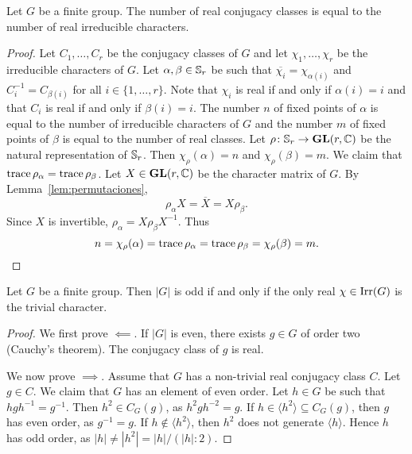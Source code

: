 \begin{theorem}[Burnside]
    Let $G$ be a finite group. The number of real conjugacy classes is equal 
    to the number of real irreducible characters. 
\end{theorem}

\begin{proof}
  Let $C_1,\dots,C_r$ be the conjugacy classes of $G$ and  
  let $\chi_1,\dots,\chi_r$ be the irreducible characters of $G$. 
  Let $\alpha,\beta\in\mathbb{S}_r$ be such that $\overline{\chi_i}=\chi_{\alpha(i)}$ and 
  $C_i^{-1}=C_{\beta(i)}$ for all $i\in\{1,\dots,r\}$. Note that $\chi_i$
  is real if and only if $\alpha(i)=i$ and that $C_i$ is real if and only if 
  $\beta(i)=i$. The number $n$ of fixed points of $\alpha$ is equal to the number
  of irreducible characters of $G$ and the number $m$ of fixed points of $\beta$ is equal
  to the number of real classes. 
  Let $\rho\colon\mathbb{S}_r\to\mathbf{GL}(r,\mathbb{C})$ be the natural representation of $\mathbb{S}_r$. Then
  $\chi_\rho(\alpha)=n$ and $\chi_\rho(\beta)=m$. We claim that 
  $\operatorname{trace}\rho_\alpha=\operatorname{trace}\rho_\beta$. 
  Let $X\in\mathbf{GL}(r,\mathbb{C})$ be the character matrix of $G$. 
  By Lemma~\ref{lem:permutaciones}, 
  \[
	\rho_\alpha X=\overline{X}=X\rho_\beta.
  \]
  Since $X$ is invertible, $\rho_{\alpha}=X\rho_{\beta}X^{-1}$. Thus 
  \[
    n=\chi_{\rho}(\alpha)=\operatorname{trace}\rho_{\alpha}=\operatorname{trace}\rho_{\beta}=\chi_{\rho}(\beta)=m.\qedhere
  \]
\end{proof}

\begin{corollary}
  \label{corollary:|G|impar}
  Let $G$ be a finite group. Then $|G|$ is odd if and only if
  the only real $\chi\in\operatorname{Irr}(G)$ is the trivial character. 
\end{corollary}

\begin{proof}
    We first prove $\impliedby$. If $|G|$ is even, there exists 
    $g\in G$ of order two (Cauchy's theorem). The conjugacy class of $g$ 
    is real. 

    We now prove $\implies$. Assume that $G$ has a non-trivial 
    real conjugacy class $C$. Let $g\in C$. We claim that 
    $G$ has an element of even order. Let $h\in G$ be such that
    $hgh^{-1}=g^{-1}$. Then $h^2\in C_G(g)$, as $h^2gh^{-2}=g$. 
    If $h\in\langle h^2\rangle\subseteq C_G(g)$, then $g$ has 
    even order, as $g^{-1}=g$. If $h\not\in\langle h^2\rangle$, then 
    $h^2$ does not generate $\langle h\rangle$. Hence $h$ has odd order, 
    as $|h|\ne|h^2|=|h|/(|h|:2)$.  
\end{proof}

